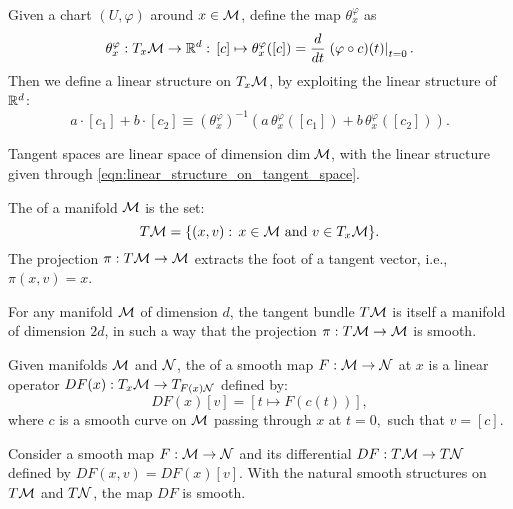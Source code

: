 \documentclass[11pt,a4paper]{article}
\begin{document}
Given a chart $(U,\varphi)$ around $x\in \mathcal{M}$, define the map $\theta^\varphi_x$ as
\begin{equation*}
\theta^\varphi_x:T_x\mathcal{M}\rightarrow \mathbb{R}^d:\,[c]\mapsto \theta^\varphi_x([c]) = \dfrac{d}{dt}\left.(\varphi\circ c)(t)\right|_{t=0}.
\end{equation*}
Then we define a linear structure on $T_x\mathcal{M}$, by exploiting the linear structure of $\mathbb{R}^d$:
\begin{equation}\label{eqn:linear_structure_on_tangent_space}
a\cdot [c_1]+b\cdot [c_2] \equiv (\theta^\varphi_x)^{-1}(a\, \theta^\varphi_x([c_1])+b\, \theta^\varphi_x([c_2])).
\end{equation}

\begin{prop}
Tangent spaces are linear space of dimension dim$\,\mathcal{M}$, with the linear structure given through \eqref{eqn:linear_structure_on_tangent_space}.
\end{prop}

\begin{mydef}
The  of a manifold $\mathcal{M}$ is the set:
\begin{equation*}
T\mathcal{M} = \{ (x,v):\, x\in \mathcal{M}\text{ and }v\in T_x\mathcal{M} \}.
\end{equation*}
The projection $\pi:T\mathcal{M}\rightarrow \mathcal{M}$ extracts the foot of a tangent vector, i.e., $\pi(x,v) = x$.
\end{mydef}

\begin{prop}
For any manifold $\mathcal{M}$ of dimension $d$, the tangent bundle $T\mathcal{M}$ is itself a manifold of dimension $2d$, in such a way that the projection $\pi:T\mathcal{M}\rightarrow \mathcal{M}$ is smooth.
\end{prop}

\begin{mydef}
Given manifolds $\mathcal{M}$ and $\mathcal{N}$, the  of a smooth map $F:\mathcal{M}\rightarrow \mathcal{N}$ at $x$ is a linear operator $DF(x):T_x\mathcal{M}\rightarrow T_{F(x)\mathcal{N}}$ defined by:
\begin{equation*}
DF(x)[v] = [t\mapsto F(c(t))],
\end{equation*}
where $c$ is a smooth curve on $\mathcal{M}$ passing through $x$ at $t = 0,$ such that $v = [c]$.
\end{mydef}

\begin{prop}
Consider a smooth map $F:\mathcal{M}\rightarrow \mathcal{N}$ and its differential $DF:T\mathcal{M}\rightarrow T\mathcal{N}$ defined by $DF(x,v) = DF(x)[v]$. With the natural smooth structures on $T\mathcal{M}$ and $T\mathcal{N}$, the map $DF$ is smooth.
\end{prop}
\end{document}
